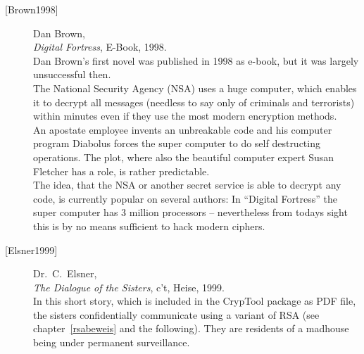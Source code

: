 \begin{description}
\item[\textrm{[Brown1998]}] 
    Dan Brown, \\
    {\em Digital Fortress}, E-Book, 1998. \\
    Dan Brown's first novel was published in 1998 as e-book, but it was
    largely unsuccessful then.\\
    The National Security Agency (NSA) uses a huge computer, which enables it
    to decrypt all messages (needless to say only of criminals and terrorists)
    within minutes even if they use the most modern encryption methods.\\
    An apostate employee invents an unbreakable code and his computer program
    Diabolus forces the super computer to do self destructing operations.
    The plot, where also the beautiful computer expert Susan Fletcher has a
    role, is rather predictable.\\
    The idea, that the NSA or another secret service is able to decrypt any
    code, is currently popular on several authors: In ``Digital Fortress'' the
    super computer has 3 million processors -- nevertheless from todays sight
    this is by no means sufficient to hack modern ciphers.\\


\item[\textrm{[Elsner1999]}] 
    Dr.~C.~Elsner, \\
    {\em The Dialogue of the Sisters}, c't, Heise, 1999. \\
    In this short story, which is included in the CrypTool package
     as PDF file, the sisters confidentially communicate
    using a variant of RSA (see chapter~\ref{rsabeweis} and the following).
    They are residents of a madhouse being under permanent surveillance.\\



\end{description}
